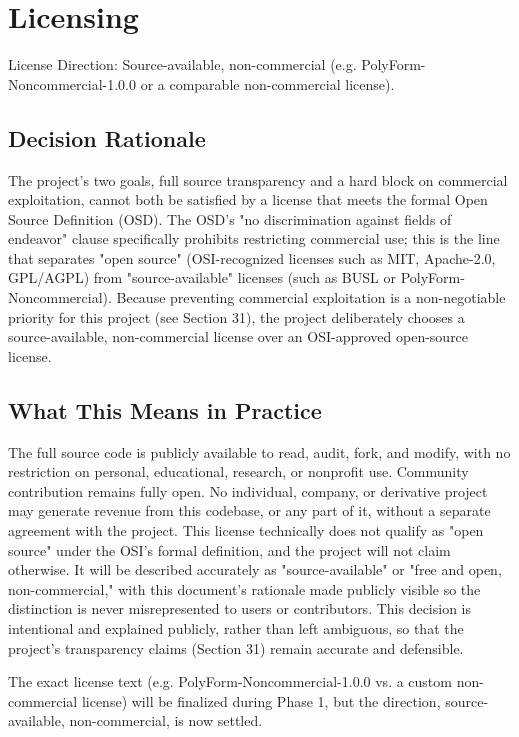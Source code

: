 
\chapter{Licensing}

License Direction: Source-available, non-commercial (e.g. PolyForm-Noncommercial-1.0.0 or a comparable non-commercial license).

\section{Decision Rationale}

The project's two goals, full source transparency and a hard block on commercial exploitation, cannot both be satisfied by a license that meets the formal Open Source Definition (OSD). The OSD's "no discrimination against fields of endeavor" clause specifically prohibits restricting commercial use; this is the line that separates "open source" (OSI-recognized licenses such as MIT, Apache-2.0, GPL/AGPL) from "source-available" licenses (such as BUSL or PolyForm-Noncommercial).
Because preventing commercial exploitation is a non-negotiable priority for this project (see Section 31), the project deliberately chooses a source-available, non-commercial license over an OSI-approved open-source license.

\section{What This Means in Practice}
The full source code is publicly available to read, audit, fork, and modify, with no restriction on personal, educational, research, or nonprofit use.
Community contribution remains fully open.
No individual, company, or derivative project may generate revenue from this codebase, or any part of it, without a separate agreement with the project.
This license technically does not qualify as "open source" under the OSI's formal definition, and the project will not claim otherwise. It will be described accurately as "source-available" or "free and open, non-commercial," with this document's rationale made publicly visible so the distinction is never misrepresented to users or contributors.
This decision is intentional and explained publicly, rather than left ambiguous, so that the project's transparency claims (Section 31) remain accurate and defensible.

The exact license text (e.g. PolyForm-Noncommercial-1.0.0 vs. a custom non-commercial license) will be finalized during Phase 1, but the direction, source-available, non-commercial, is now settled.


\sentinelchapterend
